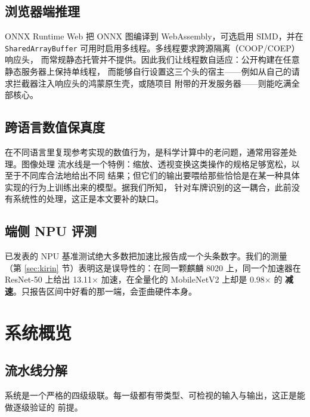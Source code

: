 \documentclass[UTF8,a4paper,11pt]{ctexart}
\begin{document}
\subsection{浏览器端推理}
ONNX Runtime Web \cite{ortweb} 把 ONNX 图编译到 WebAssembly，可选启用 SIMD，并在
\texttt{SharedArrayBuffer} 可用时启用多线程。多线程要求跨源隔离（COOP/COEP）响应头，
而常规静态托管并不提供。因此我们让线程数自适应：公开构建在任意静态服务器上保持单线程，
而能够自行设置这三个头的宿主——例如从自己的请求拦截器注入响应头的鸿蒙原生壳，或随项目
附带的开发服务器——则能吃满全部核心。

\subsection{跨语言数值保真度}
在不同语言里复现参考实现的数值行为，是科学计算中的老问题，通常用容差处理。图像处理
流水线是一个特例：缩放、透视变换这类操作的规格足够宽松，以至于不同库合法地给出不同
结果；但它们的输出要喂给那些恰恰是在某一种具体实现的行为上训练出来的模型。据我们所知，
针对车牌识别的这一耦合，此前没有系统性的处理，这正是本文要补的缺口。

\subsection{端侧 NPU 评测}
已发表的 NPU 基准测试绝大多数把加速比报告成一个头条数字。我们的测量
（第 \ref{sec:kirin} 节）表明这是误导性的：在同一颗麒麟 8020 上，同一个加速器在
ResNet-50 上给出 13.11$\times$ 加速，在全量化的 MobileNetV2 上却是 0.98$\times$ 的
\textbf{减速}。只报告区间中好看的那一端，会歪曲硬件本身。

\section{系统概览}

\subsection{流水线分解}
系统是一个严格的四级级联。每一级都有带类型、可检视的输入与输出，这正是能做逐级验证的
前提。
\end{document}

